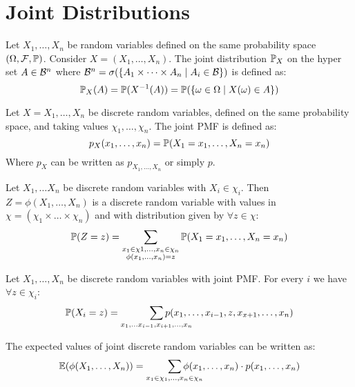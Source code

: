 \section{Joint Distributions}
\begin{definition*}
  Let \(X_1, \ldots, X_n\) be random variables defined on the same probability space \((\O, \F, \P)\). Consider \(X = (X_1, \ldots, X_n)\). The joint distribution \(\P_X\) on the hyper set \(A \in \B^n\) where \(\B^n = \sigma(\{A_1 \times \cdots \times A_n \mid A_i \in \B\})\) is defined as:
  \[\P_X(A) = \P(X^{-1}(A)) = \P(\{\omega \in \O \mid X(\omega) \in A\})\]
\end{definition*}

\begin{ddefinition*}
  Let \(X = X_1, \ldots, X_n\) be discrete random variables, defined on the same probability space, and taking values \(\chi_1, \ldots, \chi_n\). The joint PMF is defined as:
  \[p_{X}(x_1, \ldots, x_n) = \P(X_1 = x_1, \ldots, X_n = x_n)\]
  Where \(p_X\) can be written as \(p_{X_1, \ldots, X_n}\) or simply \(p\).
\end{ddefinition*}

\begin{proposition}
  Let \(X_1, \ldots X_n\) be discrete random variables with \(X_i \in \chi_i\). Then \(Z = \phi(X_1, \ldots, X_n)\) is a discrete random variable with values in \(\chi = (\chi_1 \times \ldots \times \chi_n)\) and with distribution given by \(\forall z \in \chi\):
  \[\P(Z = z) = \sum_{\substack{x_1 \in \chi1, \ldots, x_n \in \chi_n \\ \phi(x_1, \ldots, x_n) = z}} \P(X_1 = x_1, \ldots, X_n = x_n)\]
\end{proposition}

\begin{dtheorem*}
  Let \(X_1, \ldots, X_n\) be discrete random variables with joint PMF. For every \(i\) we have \(\forall z \in \chi_i\):
  \[\P(X_i = z) = \smashoperator[r]{\sum_{x_1, \ldots x_{i-1}, x_{i+1}, \ldots, x_n}} p(x_1, \ldots, x_{i-1}, z, x_{x+1}, \ldots, x_n)\]
\end{dtheorem*}

\begin{proposition}
  The expected values of joint discrete random variables can be written as:
  \[\E(\phi(X_1, \ldots, X_n)) = \smashoperator[r]{\sum_{x_1 \in \chi_1, \ldots, x_n \in \chi_n}} \phi(x_1, \ldots, x_n) \cdot p(x_1, \ldots, x_n)\]
\end{proposition}

